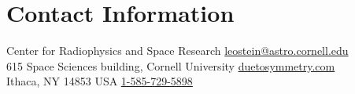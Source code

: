 \section{\sc Contact Information}
Center for Radiophysics and Space Research            \hfill \href{mailto:leostein@astro.cornell.edu}{leostein@astro.cornell.edu}\\
615 Space Sciences building, Cornell University   \hfill \href{http://duetosymmetry.com/}{duetosymmetry.com}\\
Ithaca, NY 14853 USA \hfill \href{tel:1-585-729-5898}{1-585-729-5898}


